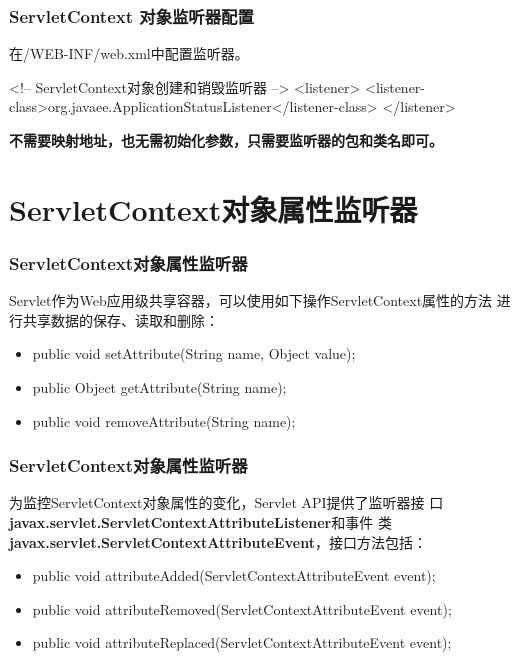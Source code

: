 \begin{frame}[fragile] %
\frametitle{ServletContext 对象监听器配置} 

在/WEB-INF/web.xml中配置监听器。

\begin{xmlCode}
<!-- ServletContext对象创建和销毁监听器 -->
<listener>  
  <listener-class>org.javaee.ApplicationStatusListener</listener-class>
</listener>  
\end{xmlCode}

{\bf\Red 不需要映射地址，也无需初始化参数，只需要监听器的包和类名即可。}
\end{frame}

\section{ServletContext对象属性监听器}

\begin{frame}[fragile] %
\frametitle{ServletContext对象属性监听器}


Servlet作为Web应用级共享容器，可以使用如下操作ServletContext属性的方法
进行共享数据的保存、读取和删除：

\begin{itemize}
\item public void setAttribute(String name, Object value);
\item public Object getAttribute(String name);
\item public void removeAttribute(String name);
\end{itemize}
\end{frame}

\begin{frame}[fragile] %
\frametitle{ServletContext对象属性监听器}

为监控ServletContext对象属性的变化，Servlet API提供了监听器接
口{\bf\Blue javax.servlet.ServletContextAttributeListener}和事件
类{\bf\Red javax.servlet.ServletContextAttributeEvent}，接口方法包括：

\begin{itemize}\small
\item public void attributeAdded(ServletContextAttributeEvent event);
\item public void attributeRemoved(ServletContextAttributeEvent
  event);
\item public void attributeReplaced(ServletContextAttributeEvent event);
\end{itemize}
\end{frame}

